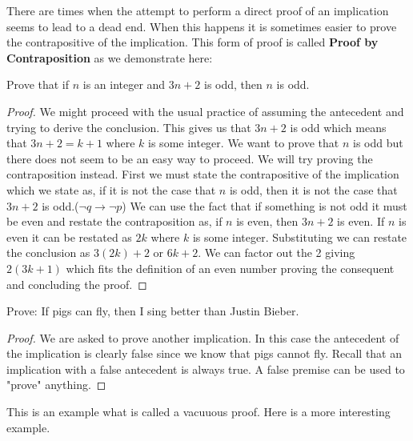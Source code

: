 There are times when the attempt to perform a direct proof  of an implication seems to lead to a dead end. When this happens it is sometimes easier to prove the contrapositive of the implication. This form of proof is called \textbf{Proof by Contraposition} as we demonstrate here:

\begin{example}
Prove that if $n$ is an integer and $3n+2$ is odd, then $n$ is odd.
\begin{proof}
We might proceed with the usual practice of assuming the antecedent and trying to derive the conclusion. This gives us that $3n+2$ is odd which means that $3n+2 = k+1$ where $k$ is some integer. We want to prove that $n$ is odd but there does not seem to be an easy way to proceed. We will try proving the contraposition instead. First we must state the contrapositive of the implication which we state as, if it is not the case that $n$ is odd, then it is not the case that $3n+2$ is odd.($\neg q\rightarrow \neg p$) We can use the fact that if something is not odd it must be even and restate the contraposition as, if $n$ is even, then $3n+2$ is even. If $n$ is even it can be restated as $2k$ where $k$ is some integer. Substituting we can restate the conclusion as $3(2k)+2$ or $6k+2$. We can factor out the 2 giving $2(3k+1)$ which fits the definition of an even number proving the consequent and concluding the proof.
\end{proof}
\end{example}

\begin{example}
Prove: If pigs can fly, then I sing better than Justin Bieber.
\begin{proof}
We are asked to prove another implication. In this case the antecedent of the implication is clearly false since we know that pigs cannot fly. Recall that an implication with a false antecedent is always true. A false premise can be used to "prove" anything.
\end{proof}
\end{example}

This is an example what is called a vacuuous proof. Here is a more interesting example.


